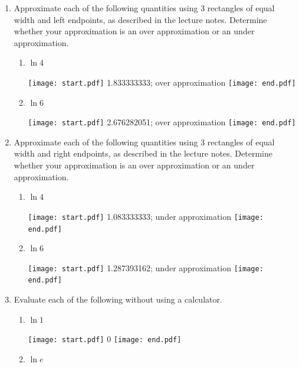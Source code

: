 \documentclass[12pt]{article}
\begin{document}
\begin{enumerate}

\item Approximate each of the following quantities using 3 rectangles of equal width and left endpoints, as described in the lecture notes.  Determine whether your approximation is an over approximation or an under approximation.

\begin{enumerate}

\item $\ln{4}$

\texttt{[image: start.pdf]}
{1.833333333; over approximation}
\texttt{[image: end.pdf]}


\item $\ln{6}$

\texttt{[image: start.pdf]}
{2.676282051; over approximation}
\texttt{[image: end.pdf]}


\end{enumerate}

\item Approximate each of the following quantities using 3 rectangles of equal width and right endpoints, as described in the lecture notes.   Determine whether your approximation is an over approximation or an under approximation.

\begin{enumerate}

\item $\ln{4}$

\texttt{[image: start.pdf]}
{{1.083333333; under approximation}}
\texttt{[image: end.pdf]}


\item $\ln{6}$

\texttt{[image: start.pdf]}
{{1.287393162; under approximation}}
\texttt{[image: end.pdf]}


\end{enumerate}

\newpage

\item Evaluate each of the following without using a calculator.

\begin{enumerate}

\item $\ln{1}$

\texttt{[image: start.pdf]}
{0}
\texttt{[image: end.pdf]}


\item $\ln{e}$


\end{enumerate}
\end{enumerate}
\end{document}
